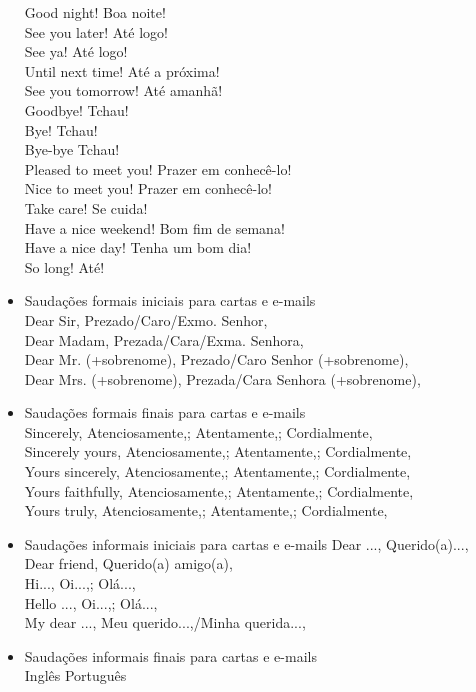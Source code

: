 \documentclass[12pt,a4paper]{article} %
\begin{document}
\begin{itemize}
Good night! 	Boa noite!\\
See you later! 	Até logo!\\
See ya! 	Até logo!\\
Until next time! 	Até a próxima!\\
See you tomorrow! 	Até amanhã!\\
Goodbye! 	Tchau!\\
Bye! 	Tchau!\\
Bye-bye 	Tchau!\\
Pleased to meet you! 	Prazer em conhecê-lo!\\
Nice to meet you! 	Prazer em conhecê-lo!\\
Take care! 	Se cuida!\\
Have a nice weekend! 	Bom fim de semana!\\
Have a nice day! 	Tenha um bom dia!\\
So long! 	Até!
\item Saudações formais iniciais para cartas e e-mails\\
Dear Sir, 	Prezado/Caro/Exmo. Senhor,\\
Dear Madam, 	Prezada/Cara/Exma. Senhora,\\
Dear Mr. (+sobrenome), 	Prezado/Caro Senhor (+sobrenome),\\
Dear Mrs. (+sobrenome), 	Prezada/Cara Senhora (+sobrenome),\\
\item Saudações formais finais para cartas e e-mails\\
Sincerely, 	Atenciosamente,; Atentamente,; Cordialmente,\\
Sincerely yours, 	Atenciosamente,; Atentamente,; Cordialmente,\\
Yours sincerely, 	Atenciosamente,; Atentamente,; Cordialmente,\\
Yours faithfully, 	Atenciosamente,; Atentamente,; Cordialmente,\\
Yours truly, 	Atenciosamente,; Atentamente,; Cordialmente,
\item Saudações informais iniciais para cartas e e-mails
Dear ..., 	Querido(a)...,\\
Dear friend, 	Querido(a) amigo(a),\\
Hi..., 	Oi...,; Olá...,\\
Hello ..., 	Oi...,; Olá...,\\
My dear ..., 	Meu querido...,/Minha querida...,
\item Saudações informais finais para cartas e e-mails\\
Inglês 	Português\\

\end{itemize}
\end{document}
